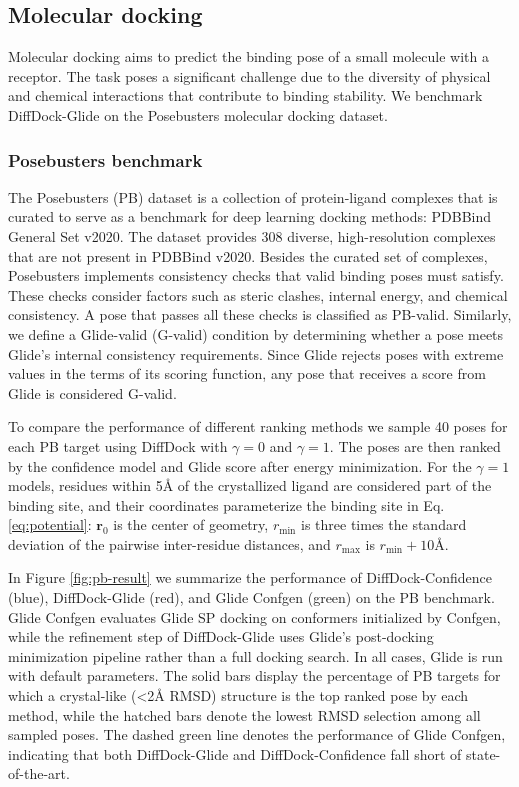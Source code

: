 \documentclass[letterpaper]{article}
\begin{document}
\subsection{Molecular docking}\label{sec:molecular-docking}
Molecular docking aims to predict the binding pose of a small molecule with a receptor. The task poses a significant challenge due to the diversity of physical and chemical interactions that contribute to binding stability. We benchmark DiffDock-Glide on the Posebusters molecular docking dataset.\cite{buttenschoen2024posebusters}

\subsubsection{Posebusters benchmark}
The Posebusters (PB) dataset is a collection of protein-ligand complexes that is curated to serve as a benchmark for deep learning docking methods: PDBBind General Set v2020.\cite{buttenschoen2024posebusters} The dataset provides 308 diverse, high-resolution complexes that are not present in PDBBind v2020. Besides the curated set of complexes, Posebusters implements consistency checks that valid binding poses must satisfy. These checks consider factors such as steric clashes, internal energy, and chemical consistency. A pose that passes all these checks is classified as PB-valid. Similarly, we define a Glide-valid (G-valid) condition by determining whether a pose meets Glide’s internal consistency requirements. Since Glide rejects poses with extreme values in the terms of its scoring function, any pose that receives a score from Glide is considered G-valid.

To compare the performance of different ranking methods we sample 40 poses for each PB target using DiffDock with $\gamma=0$ and $\gamma=1$. The poses are then ranked by the confidence model and Glide score after energy minimization. For the $\gamma=1$ models, residues within 5{\AA} of the crystallized ligand are considered part of the binding site, and their coordinates parameterize the binding site in Eq. \ref{eq:potential}: $\mathbf{r}_0$ is the center of geometry, $r_\mathrm{min}$ is three times the standard deviation of the pairwise inter-residue distances, and $r_\mathrm{max}$ is $r_\mathrm{min} + 10${\AA}.

In Figure \ref{fig:pb-result} we summarize the performance of DiffDock-Confidence (blue), DiffDock-Glide (red), and Glide Confgen (green) on the PB benchmark. Glide Confgen evaluates Glide SP docking on conformers initialized by Confgen, while the refinement step of DiffDock-Glide uses Glide's post-docking minimization pipeline rather than a full docking search. In all cases, Glide is run with default parameters. The solid bars display the percentage of PB targets for which a crystal-like (<2{\AA} RMSD) structure is the top ranked pose by each method, while the hatched bars denote the lowest RMSD selection among all sampled poses. The dashed green line denotes the performance of Glide Confgen, indicating that both DiffDock-Glide and DiffDock-Confidence fall short of state-of-the-art.
\end{document}
